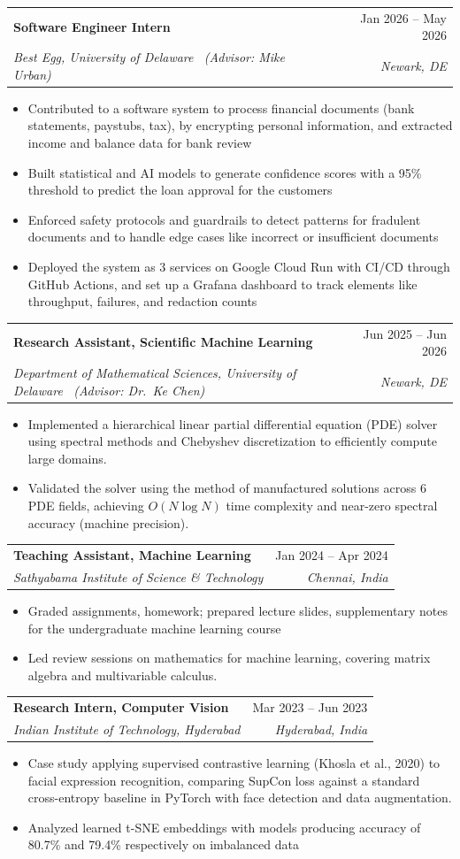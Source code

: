 \documentclass[letterpaper,10pt]{article}
\makeatletter
\newcommand{\resumeItem}[1]{
  \item\small{
    {#1 \vspace{-2pt}}
  }
}
\newcommand{\resumeSubheading}[4]{
  \vspace{2pt}\item
    \begin{tabular*}{0.97\textwidth}[t]{l@{\extracolsep{\fill}}r}
      \textbf{#1} & #2 \\
      \textit{\small#3} & \textit{\small #4} \\
    \end{tabular*}\vspace{-4pt}
}
\newcommand{\resumeItemListStart}{\begin{itemize}}
\newcommand{\resumeItemListEnd}{\end{itemize}\vspace{-8pt}}
\makeatother
\begin{document}
\resumeSubheading
      {Software Engineer Intern}{Jan 2026 -- May 2026}
      {Best Egg, University of Delaware \, (Advisor: Mike Urban)}{Newark, DE}
      \resumeItemListStart
        \resumeItem{Contributed to a software system to process financial documents (bank statements, paystubs, tax), by encrypting personal information, and extracted income and balance data for bank review}
        \resumeItem{Built statistical and AI models to generate confidence scores with a 95\% threshold to predict the loan approval for the customers}
        \resumeItem{Enforced safety protocols and guardrails to detect patterns for fradulent documents and to handle edge cases like incorrect or insufficient documents}
        \resumeItem{Deployed the system as 3 services on Google Cloud Run with CI/CD through GitHub Actions, and set up a Grafana dashboard to track elements like throughput, failures, and redaction counts}
      \resumeItemListEnd

    \resumeSubheading
      {Research Assistant, Scientific Machine Learning}{Jun 2025 -- Jun 2026}
      {Department of Mathematical Sciences, University of Delaware \, (Advisor: Dr.\ Ke Chen)}{Newark, DE}
      \resumeItemListStart
        \resumeItem{Implemented a hierarchical linear partial differential equation (PDE) solver using spectral methods and Chebyshev discretization to efficiently compute large domains.}
        \resumeItem{Validated the solver using the method of manufactured solutions across 6 PDE fields, achieving $O(N \log N)$ time complexity and near-zero spectral accuracy (machine precision).}
      \resumeItemListEnd

    \resumeSubheading
      {Teaching Assistant, Machine Learning}{Jan 2024 -- Apr 2024}
      {Sathyabama Institute of Science \& Technology}{Chennai, India}
      \resumeItemListStart
        \resumeItem{Graded assignments, homework; prepared lecture slides, supplementary notes for the undergraduate machine learning course}
        \resumeItem{Led review sessions on mathematics for machine learning, covering matrix algebra and multivariable calculus.}
      \resumeItemListEnd

    \resumeSubheading
      {Research Intern, Computer Vision}{Mar 2023 -- Jun 2023}
      {Indian Institute of Technology, Hyderabad}{Hyderabad, India}
      \resumeItemListStart
        \resumeItem{Case study applying supervised contrastive learning (Khosla et al., 2020) to facial expression recognition, comparing SupCon loss against a standard cross-entropy baseline in PyTorch with face detection and data augmentation.}
        \resumeItem{Analyzed learned t-SNE embeddings with models producing accuracy of 80.7\% and 79.4\% respectively on imbalanced data}
      \resumeItemListEnd
\end{document}
